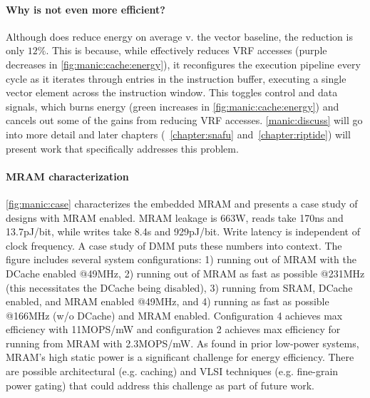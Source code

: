 \paragraph{Why is \manic not even more efficient?}
Although \manic does reduce energy on average v. the vector baseline, the reduction is only $12\%$.
% 
This is because, while \manic effectively reduces VRF accesses (purple decreases in \autoref{fig:manic:cache:energy}), it reconfigures the execution pipeline every cycle as it iterates through entries in the instruction buffer, executing a single vector element across the instruction window.
% 
This toggles control and data signals, which burns energy (green increases in \autoref{fig:manic:cache:energy}) and cancels out some of the gains from reducing VRF accesses.
% 
\autoref{manic:discuss} will go into more detail and later chapters (~\autoref{chapter:snafu} and~\autoref{chapter:riptide}) will present work that specifically addresses this problem.

\figMANICMRAMCase
\paragraph{MRAM characterization}
\autoref{fig:manic:case} characterizes the embedded MRAM and presents a case study of designs with MRAM enabled.
%
MRAM leakage is 663\textmu W, reads take 170ns and 13.7pJ/bit, while writes take 8.4\textmu s and 929pJ/bit.
%
Write latency is independent of clock frequency.
%
A case study of DMM puts these numbers into context.
%
The figure includes several system configurations: 1) \manic running out of MRAM with the DCache enabled @49MHz, 2) \manic running out of MRAM as fast as possible @231MHz (this necessitates the DCache being disabled), 3) \manic running from SRAM, DCache enabled, and MRAM enabled @49MHz, and 4) \manic running as fast as possible @166MHz (w/o DCache) and MRAM enabled.
%
Configuration 4 achieves max efficiency with 11MOPS/mW %
and configuration 2 achieves max efficiency for running from MRAM with 2.3MOPS/mW.
%
As found in prior low-power systems, MRAM's high static power is a significant challenge for energy efficiency.
% 
There are possible architectural (e.g. caching) and VLSI techniques (e.g. fine-grain power gating) that could address this challenge as part of future work.
